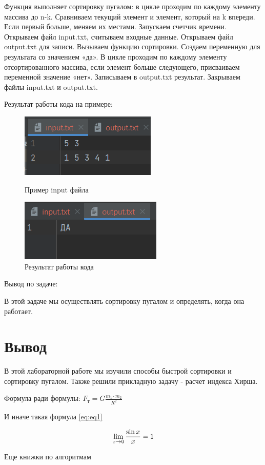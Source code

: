 Функция выполняет сортировку пугалом: в цикле проходим по каждому элементу массива до n-k. Сравниваем текущий элемент и элемент, который на k впереди. Если первый больше, меняем их местами.
Запускаем счетчик времени. Открываем файл input.txt, считываем входные данные. Открываем файл output.txt для записи. Вызываем функцию сортировки. Создаем переменную для результата со значением «да». В цикле проходим по каждому элементу отсортированного массива, если элемент больше следующего, присваиваем переменной значение «нет». Записываем в output.txt результат. Закрываем файлы input.txt и output.txt. 

Результат работы кода на примере:

\begin{figure}[H]
	\begin{center}
		\includegraphics[scale=1]{fig/input2.png}
		\caption{Пример input файла}
		\label{pic:input2} %
	\end{center}
        \begin{center}
		\includegraphics[scale=0.9]{fig/output2.png}
		\caption{Результат работы кода}
		\label{pic:output2} %
	\end{center}
\end{figure}

Вывод по задаче:

В этой задаче мы осуществлять сортировку пугалом и определять, когда она работает.

\newpage
\section*{Вывод}
В этой лабораторной работе мы изучили способы быстрой сортировки и сортировку пугалом. Также решили прикладную задачу - расчет индекса Хирша.

Формула ради формулы: $F_{т} = G\frac{m_1 \cdot m_2}{R^2}$

И иначе такая формула \eqref{eq:eq1}

\begin{equation}
    \centering
    \label{eq:eq1}
    \lim_{x \rightarrow 0} \frac{\sin x}{x}=1
\end{equation}


Еще книжки по алгоритмам \cite{bookalg1} \cite{bookalg2}